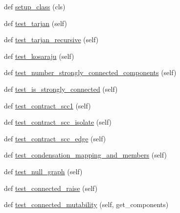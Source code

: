 \begin{DoxyCompactItemize}
\item 
def \hyperlink{classnetworkx_1_1algorithms_1_1components_1_1tests_1_1test__strongly__connected_1_1TestStronglyConnected_a9e6b35c4bcb30e67be1339b932ceb327}{setup\+\_\+class} (cls)
\item 
def \hyperlink{classnetworkx_1_1algorithms_1_1components_1_1tests_1_1test__strongly__connected_1_1TestStronglyConnected_af0f2572fa862be9e43cd9c9514878ebd}{test\+\_\+tarjan} (self)
\item 
def \hyperlink{classnetworkx_1_1algorithms_1_1components_1_1tests_1_1test__strongly__connected_1_1TestStronglyConnected_aa6fa1c31ca7086d616538c3080fcc0fe}{test\+\_\+tarjan\+\_\+recursive} (self)
\item 
def \hyperlink{classnetworkx_1_1algorithms_1_1components_1_1tests_1_1test__strongly__connected_1_1TestStronglyConnected_ac7373c2c33374fb4e692213d7a2938cd}{test\+\_\+kosaraju} (self)
\item 
def \hyperlink{classnetworkx_1_1algorithms_1_1components_1_1tests_1_1test__strongly__connected_1_1TestStronglyConnected_a834bd1e2a20a5683271bb684ac91b39d}{test\+\_\+number\+\_\+strongly\+\_\+connected\+\_\+components} (self)
\item 
def \hyperlink{classnetworkx_1_1algorithms_1_1components_1_1tests_1_1test__strongly__connected_1_1TestStronglyConnected_ab76ff517b505e5f9c1874ff0973a96fc}{test\+\_\+is\+\_\+strongly\+\_\+connected} (self)
\item 
def \hyperlink{classnetworkx_1_1algorithms_1_1components_1_1tests_1_1test__strongly__connected_1_1TestStronglyConnected_a74685e7287953df5d36ee7776a3db155}{test\+\_\+contract\+\_\+scc1} (self)
\item 
def \hyperlink{classnetworkx_1_1algorithms_1_1components_1_1tests_1_1test__strongly__connected_1_1TestStronglyConnected_af9b84ce86cc0e0a7dcc03ace9eb42f8d}{test\+\_\+contract\+\_\+scc\+\_\+isolate} (self)
\item 
def \hyperlink{classnetworkx_1_1algorithms_1_1components_1_1tests_1_1test__strongly__connected_1_1TestStronglyConnected_a97b8319e129d31349aa6e4c2636681d4}{test\+\_\+contract\+\_\+scc\+\_\+edge} (self)
\item 
def \hyperlink{classnetworkx_1_1algorithms_1_1components_1_1tests_1_1test__strongly__connected_1_1TestStronglyConnected_a74a3897dcc624e11c7e622641e8eddd6}{test\+\_\+condensation\+\_\+mapping\+\_\+and\+\_\+members} (self)
\item 
def \hyperlink{classnetworkx_1_1algorithms_1_1components_1_1tests_1_1test__strongly__connected_1_1TestStronglyConnected_af873d30297ec0055cf7369b92e61fb17}{test\+\_\+null\+\_\+graph} (self)
\item 
def \hyperlink{classnetworkx_1_1algorithms_1_1components_1_1tests_1_1test__strongly__connected_1_1TestStronglyConnected_a92e3f962e855e17bc577d142b47afd1b}{test\+\_\+connected\+\_\+raise} (self)
\item 
def \hyperlink{classnetworkx_1_1algorithms_1_1components_1_1tests_1_1test__strongly__connected_1_1TestStronglyConnected_abc1b82279bb1cc40eb9a8320ebde6463}{test\+\_\+connected\+\_\+mutability} (self, get\+\_\+components)
\end{DoxyCompactItemize}
